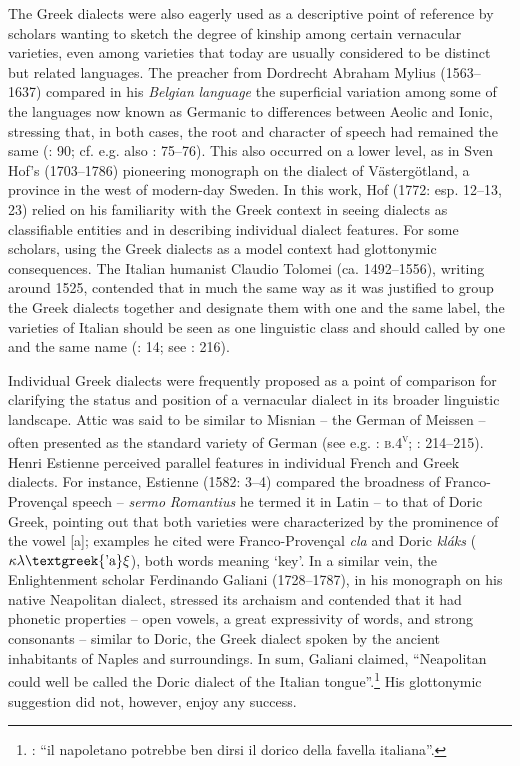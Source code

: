 The Greek dialects were also eagerly used as a descriptive point of reference by scholars wanting to sketch the degree of kinship among certain vernacular varieties, even among varieties that today are usually considered to be distinct but related languages. The preacher from Dordrecht Abraham Mylius (1563–1637) compared in his \textit{Belgian} \textit{language} the superficial variation among some of the languages now known as Germanic to differences between Aeolic and Ionic, stressing that, in both cases, the root and character of speech had remained the same (\citealt{Mylius1612}: 90; cf. e.g. also \citealt{Boxhorn1647}: 75–76). This also occurred on a lower level, as in Sven Hof’s (1703–1786) pioneering monograph on the dialect of Västergötland, a province in the west of modern-day Sweden. In this work, Hof (1772: esp. 12–13, 23) relied on his familiarity with the Greek context in seeing dialects as classifiable entities and in describing individual dialect features. For some scholars, using the Greek dialects as a model context had glottonymic consequences. The Italian humanist Claudio Tolomei (ca. 1492–1556), writing around 1525, contended that in much the same way as it was justified to group the Greek dialects together and designate them with one and the same label, the varieties of Italian should be seen as one linguistic class and should called by one and the same name (\citealt{Tolomei1555}: 14; see \citealt{Trovato1984}: 216).

Individual Greek dialects were frequently proposed as a point of comparison for clarifying the status and position of a vernacular dialect in its broader linguistic landscape. Attic was said to be similar to Misnian – the German of Meissen – often presented as the standard variety of German (see e.g. \citealt{Börner1705}: \textsc{b.4}\textsc{\textsuperscript{v}}; \citealt{Simonis1752}: 214–215). Henri Estienne perceived parallel features in individual French and Greek dialects. For instance, Estienne (1582: 3–4) compared the broadness of Franco-Provençal speech – \textit{sermo} \textit{Romantius} he termed it in Latin – to that of Doric Greek, pointing out that both varieties were characterized by the prominence of the vowel [a]; examples he cited were Franco-Provençal \textit{cla} and Doric \textit{kláks} ($\kappa \lambda \text{\textgreek{'a}}\xi $), both words meaning ‘key’. In a similar vein, the Enlightenment scholar Ferdinando Galiani (1728–1787), in his monograph on his native Neapolitan dialect, stressed its archaism and contended that it had phonetic properties – open vowels, a great expressivity of words, and strong consonants – similar to Doric, the Greek dialect spoken by the ancient inhabitants of Naples and surroundings. In sum, Galiani claimed, “Neapolitan could well be called the Doric dialect of the Italian tongue”.\footnote{\citet[16]{Galiani1779}: “il napoletano potrebbe ben dirsi il dorico della favella italiana”.} His glottonymic suggestion did not, however, enjoy any success.


